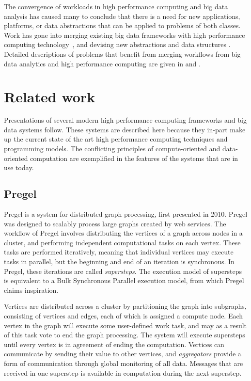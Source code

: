 \documentclass{uit-report}
\begin{document}
The convergence of workloads in high performance computing and big data analysis has caused many to conclude that there is a need for new applications, platforms, or data abstractions that can be applied to problems of both classes. Work has gone into merging existing big data frameworks with high performance computing technology~\cite{bridgingthegap}\cite{gittens2016matrix}, and devising new abstractions and data structures \cite{yang2017best}. Detailed descriptions of problems that benefit from merging workflows from big data analytics and high performance computing are given in \cite{subcommittee} and \cite{bigdataconvergence}.

\section{Related work}
Presentations of several modern high performance computing frameworks and big data systems follow. These systems are described here because they in-part make up the current state of the art high performance computing techniques and programming models. The conflicting principles of compute-oriented and data-oriented computation are exemplified in the features of the systems that are in use today.

\subsection{Pregel}
Pregel \cite{pregel} is a system for distributed graph processing, first presented in 2010. Pregel was designed to scalably process large graphs created by web services. The workflow of Pregel involves distributing the vertices of a graph across nodes in a cluster, and performing independent computational tasks on each vertex. These tasks are performed iteratively, meaning that individual vertices may execute tasks in parallel, but the beginning and end of an iteration is synchronous. In Pregel, these iterations are called \emph{supersteps}. The execution model of supersteps is equivalent to a Bulk Synchronous Parallel execution model, from which Pregel claims inspiration. 

Vertices are distributed across a cluster by partitioning the graph into subgraphs, consisting of vertices and edges, each of which is assigned a compute node. Each vertex in the graph will execute some user-defined work task, and may as a result of this task vote to end the graph processing. The system will execute supersteps until every vertex is in agreement of ending the computation. Vertices can communicate by sending their value to other vertices, and \emph{aggregators} provide a form of communication through global monitoring of all data. Messages that are received in one superstep is available in computation during the next superstep.
\end{document}

